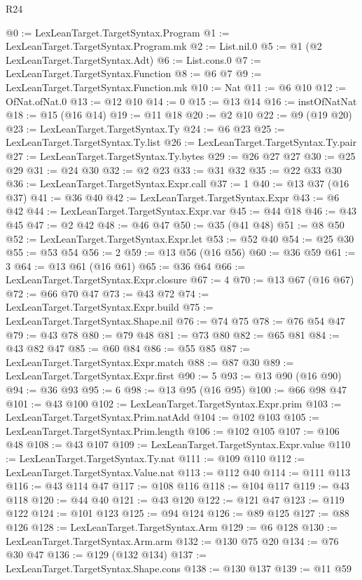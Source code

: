 \begin{lexlean}{R24}
\begin{coremodule}
@0 := LexLeanTarget.TargetSyntax.Program
@1 := LexLeanTarget.TargetSyntax.Program.mk
@2 := List.nil.{0}
@5 := @1 (@2 LexLeanTarget.TargetSyntax.Adt)
@6 := List.cons.{0}
@7 := LexLeanTarget.TargetSyntax.Function
@8 := @6 @7
@9 := LexLeanTarget.TargetSyntax.Function.mk
@10 := Nat
@11 := @6 @10
@12 := OfNat.ofNat.{0}
@13 := @12 @10
@14 := 0
@15 := @13 @14
@16 := instOfNatNat
@18 := @15 (@16 @14)
@19 := @11 @18
@20 := @2 @10
@22 := @9 (@19 @20)
@23 := LexLeanTarget.TargetSyntax.Ty
@24 := @6 @23
@25 := LexLeanTarget.TargetSyntax.Ty.list
@26 := LexLeanTarget.TargetSyntax.Ty.pair
@27 := LexLeanTarget.TargetSyntax.Ty.bytes
@29 := @26 @27 @27
@30 := @25 @29
@31 := @24 @30
@32 := @2 @23
@33 := @31 @32
@35 := @22 @33 @30
@36 := LexLeanTarget.TargetSyntax.Expr.call
@37 := 1
@40 := @13 @37 (@16 @37)
@41 := @36 @40
@42 := LexLeanTarget.TargetSyntax.Expr
@43 := @6 @42
@44 := LexLeanTarget.TargetSyntax.Expr.var
@45 := @44 @18
@46 := @43 @45
@47 := @2 @42
@48 := @46 @47
@50 := @35 (@41 @48)
@51 := @8 @50
@52 := LexLeanTarget.TargetSyntax.Expr.let
@53 := @52 @40
@54 := @25 @30
@55 := @53 @54
@56 := 2
@59 := @13 @56 (@16 @56)
@60 := @36 @59
@61 := 3
@64 := @13 @61 (@16 @61)
@65 := @36 @64
@66 := LexLeanTarget.TargetSyntax.Expr.closure
@67 := 4
@70 := @13 @67 (@16 @67)
@72 := @66 @70 @47
@73 := @43 @72
@74 := LexLeanTarget.TargetSyntax.Expr.build
@75 := LexLeanTarget.TargetSyntax.Shape.nil
@76 := @74 @75
@78 := @76 @54 @47
@79 := @43 @78
@80 := @79 @48
@81 := @73 @80
@82 := @65 @81
@84 := @43 @82 @47
@85 := @60 @84
@86 := @55 @85
@87 := LexLeanTarget.TargetSyntax.Expr.match
@88 := @87 @30
@89 := LexLeanTarget.TargetSyntax.Expr.first
@90 := 5
@93 := @13 @90 (@16 @90)
@94 := @36 @93
@95 := 6
@98 := @13 @95 (@16 @95)
@100 := @66 @98 @47
@101 := @43 @100
@102 := LexLeanTarget.TargetSyntax.Expr.prim
@103 := LexLeanTarget.TargetSyntax.Prim.natAdd
@104 := @102 @103
@105 := LexLeanTarget.TargetSyntax.Prim.length
@106 := @102 @105
@107 := @106 @48
@108 := @43 @107
@109 := LexLeanTarget.TargetSyntax.Expr.value
@110 := LexLeanTarget.TargetSyntax.Ty.nat
@111 := @109 @110
@112 := LexLeanTarget.TargetSyntax.Value.nat
@113 := @112 @40
@114 := @111 @113
@116 := @43 @114 @47
@117 := @108 @116
@118 := @104 @117
@119 := @43 @118
@120 := @44 @40
@121 := @43 @120
@122 := @121 @47
@123 := @119 @122
@124 := @101 @123
@125 := @94 @124
@126 := @89 @125
@127 := @88 @126
@128 := LexLeanTarget.TargetSyntax.Arm
@129 := @6 @128
@130 := LexLeanTarget.TargetSyntax.Arm.arm
@132 := @130 @75 @20
@134 := @76 @30 @47
@136 := @129 (@132 @134)
@137 := LexLeanTarget.TargetSyntax.Shape.cons
@138 := @130 @137
@139 := @11 @59

\end{coremodule}
\end{lexlean}
